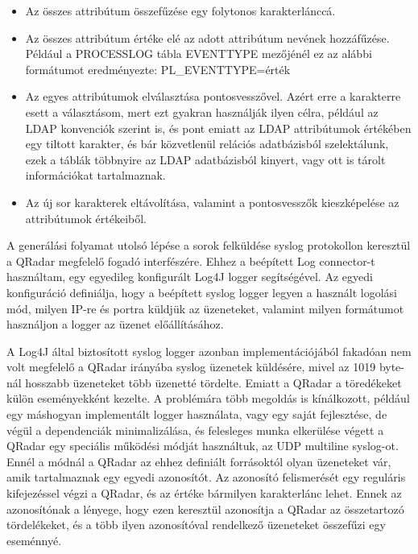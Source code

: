 \begin{itemize}
	\item Az összes attribútum összefűzése egy folytonos karakterlánccá.
	
	\item Az összes attribútum értéke elé az adott attribútum nevének hozzáfűzése. Például a PROCESSLOG tábla EVENTTYPE mezőjénél ez az alábbi formátumot eredményezte: PL\_EVENTTYPE={érték}
	
	\item Az egyes attribútumok elválasztása pontosvesszővel. Azért erre a karakterre esett a választásom, mert ezt gyakran használják ilyen célra, például az LDAP konvenciók szerint is, és pont emiatt az LDAP attribútumok értékében egy tiltott karakter, és bár közvetlenül relációs adatbázisból szelektálunk, ezek a táblák többnyire az LDAP adatbázisból kinyert, vagy ott is tárolt információkat tartalmaznak.
	
	\item Az új sor karakterek eltávolítása, valamint a pontosvesszők \todo kieszképelése az attribútumok értékeiből.
\end{itemize} 




A generálási folyamat utolsó lépése a sorok felküldése syslog protokollon keresztül a QRadar megfelelő fogadó interfészére. Ehhez a beépített Log connector-t használtam, egy egyedileg konfigurált Log4J logger segítségével. Az egyedi konfiguráció definiálja, hogy a beépített syslog logger legyen a használt logolási mód, milyen IP-re és portra küldjük az üzeneteket, valamint milyen formátumot használjon a logger az üzenet előállításához.

A Log4J által biztosított syslog logger azonban implementációjából fakadóan nem volt megfelelő a QRadar irányába syslog üzenetek küldésére, mivel az 1019 byte-nál hosszabb üzeneteket több üzenetté tördelte. Emiatt a QRadar a töredékeket külön eseményekként kezelte. A problémára több megoldás is kínálkozott, például egy máshogyan implementált logger használata, vagy egy saját fejlesztése, de végül a dependenciák minimalizálása, és felesleges munka elkerülése végett a QRadar egy speciális működési módját használtuk, az UDP multiline syslog-ot.\cite{multilnesyslog} Ennél a módnál a QRadar az ehhez definiált forrásoktól olyan üzeneteket vár, amik tartalmaznak egy egyedi azonosítót. Az azonosító felismerését egy reguláris kifejezéssel végzi a QRadar, és az értéke bármilyen karakterlánc lehet. Ennek az azonosítónak a lényege, hogy ezen keresztül azonosítja a QRadar az összetartozó tördelékeket, és a több ilyen azonosítóval rendelkező üzeneteket összefűzi egy eseménnyé.

